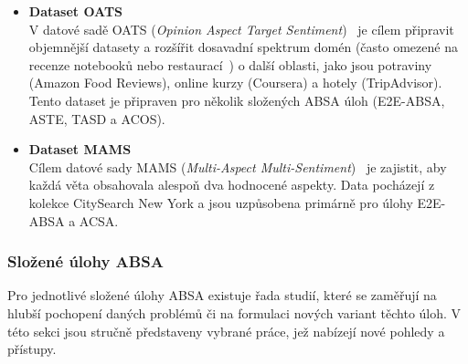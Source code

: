 \begin{itemize}
    \item \textbf{Dataset OATS} \\
    V datové sadě OATS (\emph{Opinion Aspect Target Sentiment})~\cite{chebolu-etal-2024-oats} je cílem připravit objemnější datasety a rozšířit dosavadní spektrum domén (často omezené na recenze notebooků nebo restaurací~\cite{pontiki-etal-2014-semeval}) o další oblasti, jako jsou potraviny (Amazon Food Reviews), online kurzy (Coursera) a hotely (TripAdvisor). Tento dataset je připraven pro několik složených ABSA úloh (E2E-ABSA, ASTE, TASD a ACOS).

    \item \textbf{Dataset MAMS} \\
    Cílem datové sady MAMS (\emph{Multi-Aspect Multi-Sentiment})~\cite{jiang-etal-2019-challenge} je zajistit, aby každá věta obsahovala alespoň dva hodnocené aspekty. Data pocházejí z kolekce CitySearch New York a jsou uzpůsobena primárně pro úlohy E2E-ABSA a ACSA.
\end{itemize}

\subsubsection{Složené úlohy ABSA}
Pro jednotlivé složené úlohy ABSA existuje řada studií, které se zaměřují na hlubší pochopení daných problémů či na formulaci nových variant těchto úloh. V této sekci jsou stručně představeny vybrané práce, jež nabízejí nové pohledy a přístupy.

